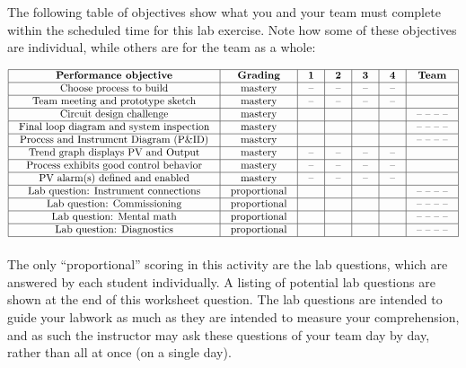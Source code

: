 \documentclass[12pt,a4paper]{book}
\begin{document}
The following table of objectives show what you and your team must complete within the scheduled time for this lab exercise.  Note how some of these objectives are individual, while others are for the team as a whole:



$$\vbox{\offinterlineskip
\halign{\strut
\vrule \quad\hfil # \ \hfil & 
\vrule \quad\hfil # \ \hfil & 
\vrule \quad\hfil # \ \hfil & 
\vrule \quad\hfil # \ \hfil & 
\vrule \quad\hfil # \ \hfil & 
\vrule \quad\hfil # \ \hfil & 
\vrule \quad\hfil # \ \hfil \vrule \cr
\noalign{\hrule}
%
{\bf Performance objective} & {\bf Grading} & {\bf 1} & {\bf 2} & {\bf 3} & {\bf 4} & {\bf Team} \cr
%
\noalign{\hrule}
%
Choose process to build & mastery & -- & -- & -- & -- & \cr
%
\noalign{\hrule}
%
Team meeting and prototype sketch & mastery & -- & -- & -- & -- & \cr
%
\noalign{\hrule}
%
Circuit design challenge & mastery & & & & & -- -- -- -- \cr
%
\noalign{\hrule}
%
Final loop diagram and system inspection & mastery & & & & & -- -- -- -- \cr
%
\noalign{\hrule}
%
Process and Instrument Diagram (P\&ID) & mastery & & & & & -- -- -- -- \cr
%
\noalign{\hrule}
%
Trend graph displays PV and Output & mastery & -- & -- & -- & -- &  \cr
%
\noalign{\hrule}
%
Process exhibits good control behavior & mastery & -- & -- & -- & -- &  \cr
%
\noalign{\hrule}
%
PV alarm(s) defined and enabled & mastery & -- & -- & -- & -- &  \cr
%
\noalign{\hrule}
%
Lab question: Instrument connections & proportional &  &  &  &  & -- -- -- -- \cr
%
\noalign{\hrule}
%
Lab question: Commissioning & proportional &  &  &  &  & -- -- -- -- \cr
%
\noalign{\hrule}
%
Lab question: Mental math & proportional &  &  &  &  & -- -- -- -- \cr
%
\noalign{\hrule}
%
Lab question: Diagnostics & proportional &  &  &  &  & -- -- -- -- \cr
%
\noalign{\hrule}
} %
}$$ %

The only ``proportional'' scoring in this activity are the lab questions, which are answered by each student individually.  A listing of potential lab questions are shown at the end of this worksheet question.  The lab questions are intended to guide your labwork as much as they are intended to measure your comprehension, and as such the instructor may ask these questions of your team day by day, rather than all at once (on a single day).
\end{document}
